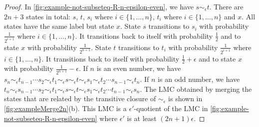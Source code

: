 \begin{proof}
	
	In \cref{fig:example-not-subseteq-R-n-epsilon-even}, we have $s \sim_{\epsilon} t$. There are $2n+3$ states in total: $s$, $t$, $s_i$ where $i\in\{1,\ldots,n\}$, $t_i$ where $i\in \{1,\ldots,n\}$ and $x$. All states have the same label but state $x$. State $s$ transitions to $s_i$ with probability $\frac{1}{2^{i+1}}$ where $i \in \{1,\ldots,n\}$. It transitions back to itself with probability $\frac{1}{2}$ and to state $x$ with probability $\frac{1}{2^{n+1}}$. State $t$ transitions to $t_i$ with probability $\frac{1}{2^{i+1}}$ where $i \in \{1,\ldots,n\}$. It transitions back to itself with probability $\frac{1}{2}+\epsilon$ and to state $x$ with probability $\frac{1}{2^{n+1}}-\epsilon$.  If $n$ is an even number, we have $s_{n} \sim_{\epsilon}  t_{n-1}  \cdots s_2 \sim_{\epsilon}  t_1 \sim_{\epsilon}  s \sim_{\epsilon} t \sim_{\epsilon}  s_1 \sim_{\epsilon}  t_2 \cdots  s_{n-1} \sim_{\epsilon} t_{n}$. If $n$ is an odd number, we have $t_{n} \sim_{\epsilon}  s_{n-1}  \cdots s_2 \sim_{\epsilon}  t_1 \sim_{\epsilon}  s \sim_{\epsilon} t \sim_{\epsilon}  s_1 \sim_{\epsilon}  t_2 \cdots  t_{n-1} \sim_{\epsilon} s_{n}$. The  LMC obtained by merging the states that are related by the transitive closure of $\sim_{\epsilon}$ is shown in \cref{fig:exampleMerge2n}(b). This LMC is a $\epsilon'$-quotient of the LMC in \cref{fig:example-not-subseteq-R-n-epsilon-even} where $\epsilon'$ is at least $(2n+1)\epsilon$.
	
\end{proof}

